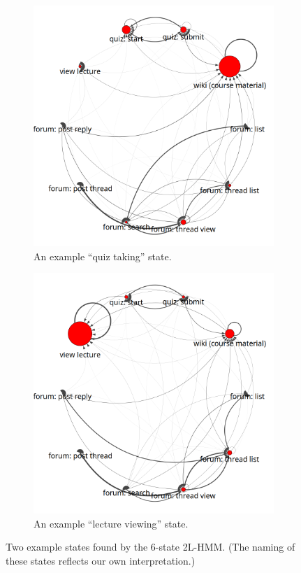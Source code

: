 \begin{figure}
  \centering
  \begin{subfigure}[t]{0.5\textwidth}
    \includegraphics[width=\textwidth]{figures/text-6state/state0.png}
    \caption{An example ``quiz taking'' state.}
    \label{fig:practice-quiz-state}
  \end{subfigure}%
  \begin{subfigure}[t]{0.5\textwidth}
    \includegraphics[width=\textwidth]{figures/text-6state/state1.png}
    \caption{An example ``lecture viewing'' state.}
    \label{fig:lecture-viewing-state}
  \end{subfigure}
  \caption{Two example states found by the 6-state 2L-HMM. (The naming of
  these states reflects our own interpretation.)}
  \label{fig:states}
\end{figure}

